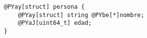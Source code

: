 \begin{Verbatim}[commandchars=@\[\]]
@PYay[struct] persona {
    @PYay[struct] string @PYbe[*]nombre;
    @PYaJ[uint64_t] edad;
}
\end{Verbatim}

